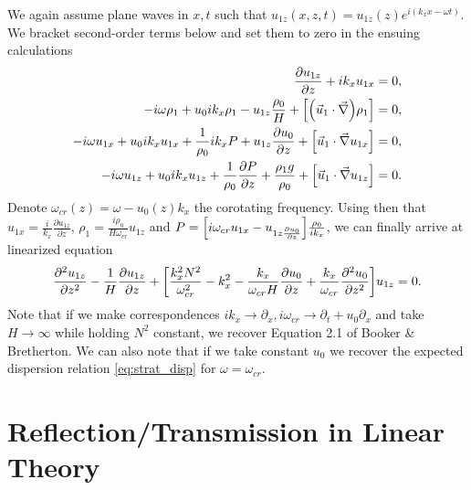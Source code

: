 \documentclass[11pt,
        usenames, %
        dvipsnames %
    ]{report}
\newcommand*{\pd}[2]{\frac{\partial#1}{\partial#2}}
\newcommand*{\ptd}[2]{\frac{\partial^2 #1}{\partial#2^2}}
\DeclarePairedDelimiter\p{\lparen}{\rparen}
\DeclarePairedDelimiter\s{\lbrack}{\rbrack}
\begin{document}
We again assume plane waves in $x, t$ such that $u_{1z}(x, z, t) =
u_{1z}(z)e^{i(k_xx - \omega t)}$. We bracket second-order terms below and set
them to zero in the ensuing calculations
\begin{subequations}
    \begin{align}
        \pd{u_{1z}}{z} + ik_xu_{1x} &= 0,\\
        -i\omega \rho_1 + u_0ik_x\rho_1
            - u_{1z}\frac{\rho_0}{H}
            + \s*{\p*{\vec{u}_1 \cdot \vec{\nabla}} \rho_1} &= 0,\\
        -i\omega u_{1x} + u_0ik_x u_{1x}
            + \frac{1}{\rho_0}ik_xP + u_{1z}\pd{u_0}{z}
            + \s*{\vec{u}_1 \cdot \vec{\nabla} u_{1x}} &= 0,\\
        -i\omega u_{1z} + u_0ik_x u_{1z}
            + \frac{1}{\rho_0}\pd{P}{z} + \frac{\rho_1 g}{\rho_0}
            + \s*{\vec{u}_1 \cdot \vec{\nabla} u_{1z}} &= 0.\\
    \end{align}
\end{subequations}
Denote $\omega_{cr}(z) = \omega - u_0(z)k_x$ the corotating frequency. Using
then that $u_{1x} = \frac{i}{k_x}\pd{u_{1z}}{z}$, $\rho_1 = \frac{i
\rho_0}{H\omega_{cr}} u_{1z}$ and $P = \s*{i\omega_{cr}u_{1x} - u_{1z
\pd{u_0}{z}}} \frac{\rho_0}{ik_x}$, we can finally arrive at linearized equation
\begin{equation}
    \ptd{u_{1z}}{z} - \frac{1}{H}\pd{u_{1z}}{z} + \s*{
        \frac{k_x^2N^2}{\omega_{cr}^2}
            - k_x^2
            - \frac{k_x}{\omega_{cr}H}\pd{u_0}{z}
            + \frac{k_x}{\omega_{cr}} \ptd{u_0}{z}
    } u_{1z} = 0. \label{eq:shear_lin_uz}
\end{equation}
Note that if we make correspondences $ik_x \to \partial_x, i\omega_{cr} \to
\partial_t + u_0\partial_x$ and take $H \to \infty$ while holding $N^2$
constant, we recover Equation 2.1 of Booker \& Bretherton. We can also note that
if we take constant $u_0$ we recover the expected dispersion relation
\autoref{eq:strat_disp} for $\omega = \omega_{cr}$.

\section{Reflection/Transmission in Linear Theory}
\end{document}
